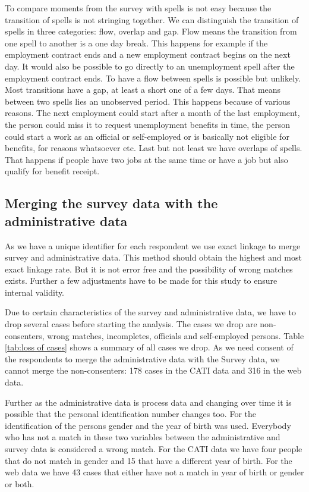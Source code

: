 To compare moments from the survey with spells is not easy because the transition of spells is not stringing together. We can distinguish the transition of spells in three categories: flow, overlap and gap. Flow means the transition from one spell to another is a one day break. This happens for example if the employment contract ends and a new employment contract begins on the next day. It would also be possible to go directly to an unemployment spell after the employment contract ends. To have a flow between spells is possible but unlikely. Most transitions have a gap, at least a short one of a few days. That means between two spells lies an unobserved period. This happens because of various reasons. The next employment could start after a month of the last employment, the person could miss it to request unemployment benefits in time, the person could start a work as an official or self-employed or is basically not eligible for benefits, for reasons whatsoever etc. Last but not least we have overlaps of spells. That happens if people have two jobs at the same time or have a job but also qualify for benefit receipt.


\subsection{Merging the survey data with the administrative data}\label{mergeing}

As we have a unique identifier for each respondent we use exact linkage to merge survey and administrative data. This method should obtain the highest and most exact linkage rate. But it is not error free and the possibility of wrong matches exists. Further a few adjustments have to be made for this study to ensure internal validity.

Due to certain characteristics of the survey and administrative data, we have to drop several cases before starting the analysis. The cases we drop are non-consenters, wrong matches, incompletes, officials and self-employed persons. Table \ref{tab:loss of cases} shows a summary of all cases we drop. As we need consent of the respondents to merge the administrative data with the Survey data, we cannot merge the non-consenters: 178 cases in the CATI data and 316 in the web data.


%

Further as the administrative data is process data and changing over time it is possible that the personal identification number changes too. For the identification of the persons gender and the year of birth was used. Everybody who has not a match in these two variables between the administrative and survey data is considered a wrong match. For the CATI data we have four people that do not match in gender and 15 that have a different year of birth. For the web data we have 43 cases that either have not a match in year of birth or gender or both.

